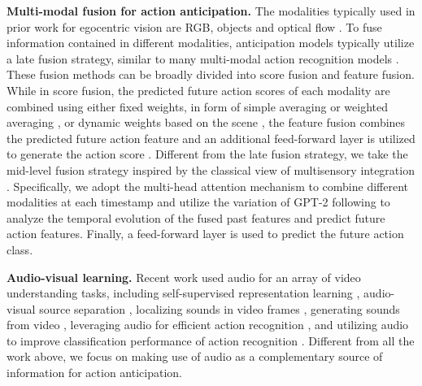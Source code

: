 \documentclass[10pt,twocolumn,letterpaper,dvipsnames]{article}
\begin{document}
\textbf{Multi-modal fusion for action anticipation.} The modalities typically used in prior work for egocentric vision are RGB, objects and optical flow \cite{furnariWhatWouldYou2019,senerTemporalAggregateRepresentations2020,wuLearningAnticipateEgocentric2021,zatsarynnaMultiModalTemporalConvolutional2021,girdharAnticipativeVideoTransformer2021}. To fuse information contained in different modalities, anticipation models typically utilize a late fusion strategy, similar to many multi-modal action recognition models \cite{wangTemporalSegmentNetworks2016,carreiraQuoVadisAction2017,kazakosEPICFusionAudioVisualTemporal2019}. These fusion methods can be broadly divided into score fusion and feature fusion. While in score fusion, the predicted future action scores of each modality are combined using either fixed weights, in form of simple averaging \cite{senerTemporalAggregateRepresentations2020,wuLearningAnticipateEgocentric2021} or weighted averaging \cite{girdharAnticipativeVideoTransformer2021}, or dynamic weights based on the scene \cite{furnariWhatWouldYou2019}, the feature fusion combines the predicted future action feature and an additional feed-forward layer is utilized to generate the action score \cite{zatsarynnaMultiModalTemporalConvolutional2021}. Different from the late fusion strategy, we take the mid-level fusion strategy inspired by the classical view of multisensory integration \cite{bloom1988brain,talsma2015predictive}. Specifically, we adopt the multi-head attention mechanism \cite{vaswaniAttentionAllYou2017} to combine different modalities at each timestamp and utilize the variation of GPT-2 following \cite{girdharAnticipativeVideoTransformer2021} to analyze the temporal evolution of the fused past features and predict future action features. Finally, a feed-forward layer is used to predict the future action class.

\textbf{Audio-visual learning.} Recent work used audio for an array of video understanding tasks, including self-supervised representation learning \cite{aytar2016soundnet,arandjelovicLookListenLearn2017a,korbarCooperativeLearningAudio2018}, audio-visual source separation \cite{owensAudioVisualSceneAnalysis2018a,afouras2018conversation,ephrat2018looking}, localizing sounds in video frames \cite{arandjelovic2018objects,senocak2019learning}, generating sounds from video \cite{owens2016visually,zhou2018visual,gao20192}, leveraging audio for efficient action recognition \cite{korbarSCSamplerSamplingSalient2019,gaoListenLookAction2020}, and utilizing audio to improve classification performance of action recognition \cite{kazakosEPICFusionAudioVisualTemporal2019,kazakosLittleHelpMy2021,nagraniAttentionBottlenecksMultimodal2021}. Different from all the work above, we focus on making use of audio as a complementary source of information for action anticipation.
\end{document}

